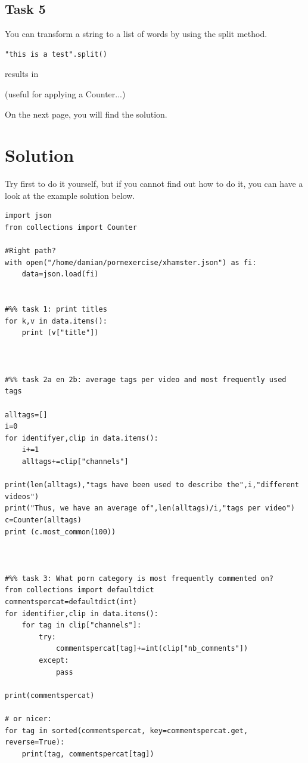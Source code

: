 \documentclass[a4paper,12pt]{book}
\begin{document}
\begin{appendices}
\subsection*{Task 5}
You can transform a string to a list of words by using the split method.
\begin{lstlisting}
"this is a test".split()
\end{lstlisting}
results in
\begin{lstlistingoutput}
\end{lstlistingoutput}
(useful for applying a Counter...)


On the next page, you will find the solution.

\newpage
\section{Solution}
Try first to do it yourself, but if you cannot find out how to do it, you can have a look at the example solution below.

\begin{lstlisting}
import json
from collections import Counter

#Right path?
with open("/home/damian/pornexercise/xhamster.json") as fi:
    data=json.load(fi)


#%% task 1: print titles
for k,v in data.items():
    print (v["title"])



#%% task 2a en 2b: average tags per video and most frequently used tags

alltags=[]
i=0
for identifyer,clip in data.items():
    i+=1
    alltags+=clip["channels"]

print(len(alltags),"tags have been used to describe the",i,"different videos")
print("Thus, we have an average of",len(alltags)/i,"tags per video")
c=Counter(alltags)
print (c.most_common(100))



#%% task 3: What porn category is most frequently commented on?
from collections import defaultdict
commentspercat=defaultdict(int)
for identifier,clip in data.items():
    for tag in clip["channels"]:
        try:
            commentspercat[tag]+=int(clip["nb_comments"])
        except:
            pass

print(commentspercat)

# or nicer:
for tag in sorted(commentspercat, key=commentspercat.get, reverse=True):
    print(tag, commentspercat[tag])




\end{lstlisting}
\end{appendices}
\end{document}
